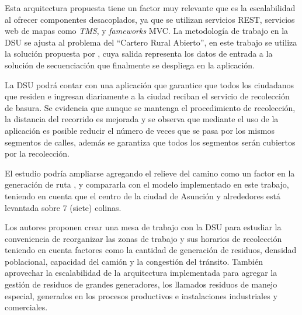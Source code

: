 \documentclass[conference]{IEEEtran}
\begin{document}
Esta arquitectura propuesta tiene un factor muy relevante que es la escalabilidad al ofrecer componentes desacoplados, ya que se utilizan servicios REST, servicios web de mapas como \textit{TMS}, y \textit{fameworks} MVC. La metodología de trabajo en la DSU se ajusta al problema del ``Cartero Rural Abierto'', en este trabajo se utiliza la solución propuesta por \cite{Braier2017AnArgentina}, cuya salida representa los datos de entrada a la solución de secuenciación que finalmente se despliega en la aplicación.

La DSU podrá contar con una aplicación que garantice que todos los ciudadanos que residen e ingresan diariamente a la ciudad reciban el servicio de recolección de basura. Se evidencia que aunque se mantenga el procedimiento de recolección, la distancia del recorrido es mejorada y se observa que mediante el uso de la aplicación es posible reducir el número de veces que se pasa por los mismos segmentos de calles, además se garantiza que todos los segmentos serán cubiertos por la recolección.

El estudio podría ampliarse agregando el relieve del camino como un factor en la generación de ruta \cite{Sulemana2018OptimalMethods}, y compararla con el modelo implementado en este trabajo, teniendo en cuenta que el centro de la ciudad de Asunción y alrededores está levantada sobre 7 (siete) colinas.

Los autores proponen crear una mesa de trabajo con la DSU para estudiar la conveniencia de reorganizar las zonas de trabajo y sus horarios de recolección teniendo en cuenta factores como la cantidad de generación de residuos, densidad poblacional, capacidad del camión y la congestión del tránsito. También aprovechar la escalabilidad de la arquitectura implementada para agregar la gestión de residuos de grandes generadores, los llamados residuos de manejo especial, generados en los procesos productivos e instalaciones industriales y comerciales.







\vspace{12pt}
\end{document}
